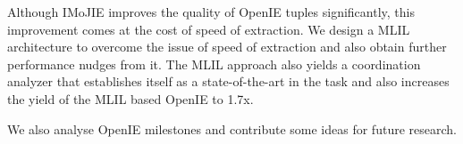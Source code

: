 Although IMoJIE improves the quality of OpenIE tuples significantly, this improvement comes at the cost of speed of extraction. We design a MLIL architecture to overcome the issue of speed of extraction and also obtain further performance nudges from it. The MLIL approach also yields a coordination analyzer that establishes itself as a state-of-the-art in the task and also increases the yield of the MLIL based OpenIE to 1.7x.

We also analyse OpenIE milestones and contribute some ideas for future research.



